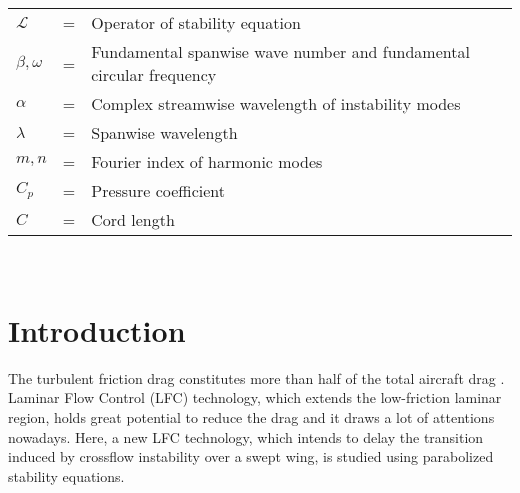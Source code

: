 \documentclass{AIAA}
\begin{document}
\begin{tabular}{@{}lcl@{}}
$\mathscr{L}$         &=& Operator of stability equation \\
$\beta,\omega$        &=& Fundamental spanwise wave number and fundamental circular frequency\\
$\alpha$              &=& Complex streamwise wavelength of instability modes\\
$\lambda$             &=& Spanwise wavelength\\ 
$m,n$                 &=& Fourier index of harmonic modes\\
$C_p$                 &=& Pressure coefficient\\
$C$                   &=& Cord length\\

\end{tabular} \\



\section{Introduction}
The turbulent friction drag constitutes more than half of the total aircraft drag \cite{Schrauf2005}. Laminar Flow Control (LFC) technology, which extends the low-friction laminar region, holds great potential to reduce the drag and it draws a lot of attentions nowadays. Here, a new LFC technology, which intends to delay the transition induced by crossflow instability over a swept wing, is studied using parabolized stability equations.
\end{document}
